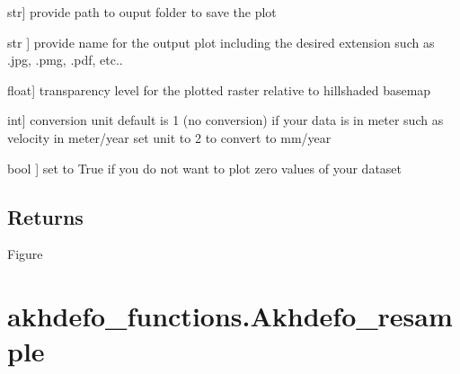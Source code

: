 \documentclass[letterpaper,10pt]{sphinxmanual}
\begin{document}
\begin{fulllineitems}
\begin{description}
\sphinxlineitem{outputfolder}{[}str{]}
\sphinxAtStartPar
provide path to ouput folder to save the plot

\sphinxlineitem{outputfileName}{[}str {]}
\sphinxAtStartPar
provide name for the output plot including the desired extension such as .jpg, .pmg, .pdf, etc..

\sphinxlineitem{alpha}{[}float{]}
\sphinxAtStartPar
transparency level for the plotted raster relative to hillshaded basemap

\sphinxlineitem{unit}{[}int{]}
\sphinxAtStartPar
conversion unit default is 1 (no conversion) if your data is in meter such as velocity in meter/year set unit to 2 to convert to mm/year

\sphinxlineitem{noDATA\_MAsk}{[}bool {]}
\sphinxAtStartPar
set to True if you do not want to plot zero values of your dataset

\end{description}


\section{Returns}
\label{\detokenize{generated/akhdefo_functions.akhdefo_viewer:returns}}
\sphinxAtStartPar
Figure

\end{fulllineitems}


\sphinxstepscope


\chapter{akhdefo\_functions.Akhdefo\_resample}
\label{\detokenize{generated/akhdefo_functions.Akhdefo_resample:akhdefo-functions-akhdefo-resample}}\label{\detokenize{generated/akhdefo_functions.Akhdefo_resample::doc}}
\end{document}
